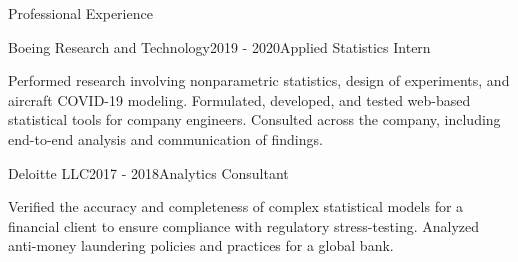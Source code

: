 \documentclass{resume} %
\begin{document}
\begin{rSection}{Professional Experience}

\begin{rSubsection}{Boeing Research and Technology}{2019 - 2020}{Applied Statistics Intern}{}

Performed research involving nonparametric statistics, design of experiments, and aircraft COVID-19 modeling. Formulated, developed, and tested web-based statistical tools for company engineers. Consulted across the company, including end-to-end analysis and communication of findings.
\end{rSubsection}

\begin{rSubsection}{Deloitte LLC}{2017 - 2018}{Analytics Consultant}{}

Verified the accuracy and completeness of complex statistical models for a financial client to ensure compliance with regulatory stress-testing. Analyzed anti-money laundering policies and practices for a global bank.
\end{rSubsection}

\end{rSection}
\end{document}
